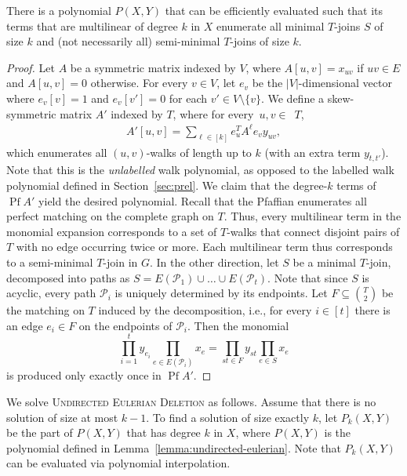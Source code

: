 \documentclass{theoretics}
\newcommand{\cP}{\ensuremath{\mathcal P}\xspace}
\DeclareMathOperator{\Pf}{Pf}
\begin{document}
\begin{lemma} \label{lemma:undirected-eulerian}
  There is a polynomial $P(X,Y)$ that can be efficiently evaluated such that its terms that are multilinear of degree $k$ in $X$  enumerate all minimal $T$-joins $S$ of size $k$ and (not necessarily all) semi-minimal $T$-joins of size $k$. 
\end{lemma}
\begin{proof}
  Let $A$ be a symmetric matrix indexed by $V$, where $A[u, v] = x_{uv}$ if $uv \in E$ and $A[u, v] = 0$ otherwise.
  For every $v \in V$, let $e_v$ be the $|V|$-dimensional vector where $e_v[v] = 1$ and $e_v[v']= 0$ for each $v' \in V \setminus \{ v \}$.
  We define a skew-symmetric matrix $A'$ indexed by $T$, where for every~$u, v \in$~$T$,
  \begin{align*}
    A'[u, v] = \sum_{\ell \in [k]} e_u^T A^{\ell} e_v y_{uv},
  \end{align*}
  which enumerates all $(u,v)$-walks of length up to $k$ (with an extra term $y_{t,t'}$).
  Note that this is the \emph{unlabelled} walk polynomial, as opposed to the labelled walk polynomial defined in Section~\ref{sec:prel}.
  We claim that the degree-$k$ terms of $\Pf A'$ yield the desired polynomial.
  Recall that the Pfaffian enumerates all perfect matching on the complete graph on $T$.
  Thus, every multilinear term in the monomial expansion corresponds to a set of $T$-walks that connect disjoint pairs of $T$ with no edge occurring twice or more.
  Each multilinear term thus corresponds to a semi-minimal $T$-join in $G$.
  In the other direction, let $S$ be a minimal $T$-join, decomposed into paths as $S=E(\cP_1) \cup \ldots \cup E(\cP_t)$.
  Note that since $S$ is acyclic, every path $\cP_i$ is uniquely determined by its endpoints. 
  Let $F \subseteq \binom{T}{2}$ be the matching on $T$ induced by the decomposition,
  i.e., for every $i \in [t]$ there is an edge $e_i \in F$ on the endpoints of $\cP_i$.
  Then the monomial
  \[
    \prod_{i=1}^t y_{e_i} \prod_{e \in E(\cP_i)} x_e = \prod_{st \in F} y_{st} \prod_{e \in S} x_e
  \]
  is produced only exactly once in $\Pf A'$. 
\end{proof}

We solve \textsc{Undirected Eulerian Deletion} as follows.
Assume that there is no solution of size at most $k - 1$.
To find a solution of size exactly $k$, let $P_k(X,Y)$ be the part of $P(X,Y)$ that has degree $k$ in $X$, 
where $P(X,Y)$ is the polynomial defined in Lemma~\ref{lemma:undirected-eulerian}.
Note that $P_k(X,Y)$ can be evaluated via polynomial interpolation. 
\end{document}
